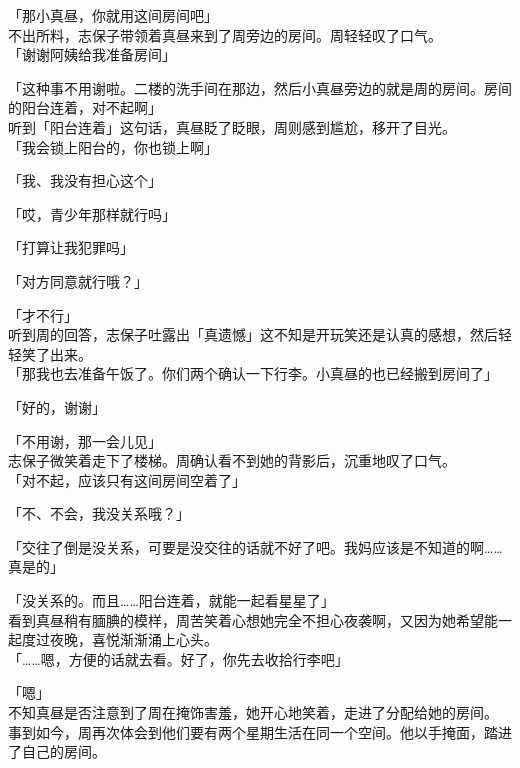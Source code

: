 「那小真昼，你就用这间房间吧」\\

不出所料，志保子带领着真昼来到了周旁边的房间。周轻轻叹了口气。\\

「谢谢阿姨给我准备房间」

「这种事不用谢啦。二楼的洗手间在那边，然后小真昼旁边的就是周的房间。房间的阳台连着，对不起啊」\\

听到「阳台连着」这句话，真昼眨了眨眼，周则感到尴尬，移开了目光。\\

「我会锁上阳台的，你也锁上啊」

「我、我没有担心这个」

「哎，青少年那样就行吗」

「打算让我犯罪吗」

「对方同意就行哦？」

「才不行」\\

听到周的回答，志保子吐露出「真遗憾」这不知是开玩笑还是认真的感想，然后轻轻笑了出来。\\

「那我也去准备午饭了。你们两个确认一下行李。小真昼的也已经搬到房间了」

「好的，谢谢」

「不用谢，那一会儿见」\\

志保子微笑着走下了楼梯。周确认看不到她的背影后，沉重地叹了口气。\\

「对不起，应该只有这间房间空着了」

「不、不会，我没关系哦？」

「交往了倒是没关系，可要是没交往的话就不好了吧。我妈应该是不知道的啊……真是的」

「没关系的。而且……阳台连着，就能一起看星星了」\\

看到真昼稍有腼腆的模样，周苦笑着心想她完全不担心夜袭啊，又因为她希望能一起度过夜晚，喜悦渐渐涌上心头。\\

「……嗯，方便的话就去看。好了，你先去收拾行李吧」

「嗯」\\

不知真昼是否注意到了周在掩饰害羞，她开心地笑着，走进了分配给她的房间。\\

事到如今，周再次体会到他们要有两个星期生活在同一个空间。他以手掩面，踏进了自己的房间。\\

